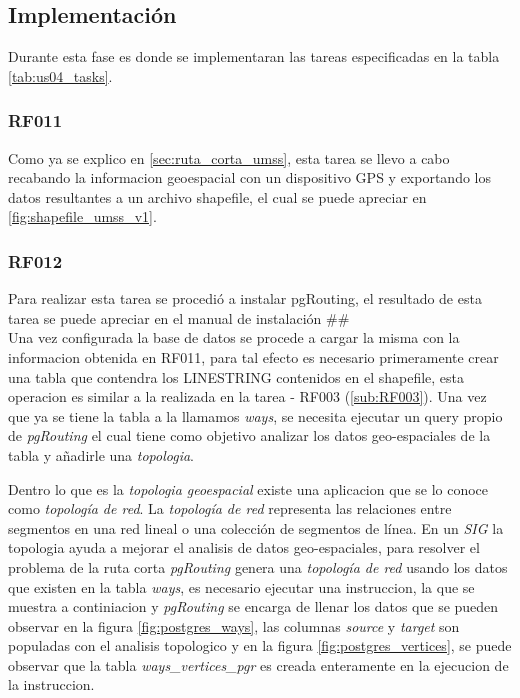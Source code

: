     


\subsection{Implementación}
\label{sub:implementacion_iteracion_1}

Durante esta fase es donde se implementaran las tareas especificadas en la tabla \ref{tab:us04_tasks}.

\subsubsection{RF011}
\label{subs:RF011}


Como ya se explico en \ref{sec:ruta_corta_umss}, esta tarea se llevo a cabo recabando la informacion geoespacial con un dispositivo GPS y exportando los datos resultantes a un archivo shapefile, el cual se puede apreciar en \ref{fig:shapefile_umss_v1}.

\subsubsection{RF012}
\label{subs:RF012}


Para realizar esta tarea se procedió a instalar pgRouting, el resultado de esta tarea se puede apreciar en el manual de instalación ## \\

Una vez configurada la base de datos se procede a cargar la misma con la informacion obtenida en RF011, para tal efecto es necesario primeramente crear una tabla que contendra los LINESTRING contenidos en el shapefile, esta operacion es similar a la realizada en la tarea - RF003 (\ref{sub:RF003}). Una vez que ya se tiene la tabla a la llamamos \emph{ways}, se necesita ejecutar un query propio de \emph{pgRouting} el cual tiene como objetivo analizar los datos geo-espaciales de la tabla y a\~nadirle una \emph{topologia}.

Dentro lo que es la \emph{topologia geoespacial} existe una aplicacion que se lo conoce como \emph{topología de red}. La \emph{topología de red} representa las relaciones entre segmentos en una red lineal o una colección de segmentos de línea\cite{osgeo_journal_topology}.
En un \emph{SIG} la topologia ayuda a mejorar el analisis de datos geo-espaciales, para resolver el problema de la ruta corta \emph{pgRouting} genera una \emph{topología de red} usando los datos que existen en la tabla \emph{ways}, es necesario ejecutar una instruccion, la que se muestra a continiacion y \emph{pgRouting} se encarga de llenar los datos que se pueden observar en la figura \ref{fig:postgres_ways}, las columnas \emph{source} y \emph{target} son populadas con el analisis topologico y en la figura \ref{fig:postgres_vertices}, se puede observar que la tabla \emph{ways\_vertices\_pgr} es creada enteramente en la ejecucion de la instruccion.

